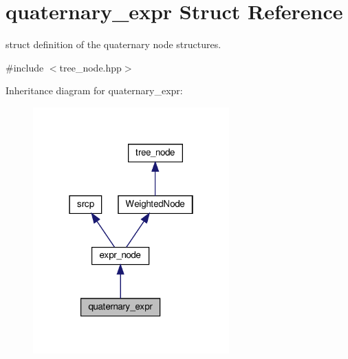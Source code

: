 \hypertarget{structquaternary__expr}{}\section{quaternary\+\_\+expr Struct Reference}
\label{structquaternary__expr}


struct definition of the quaternary node structures.  




{\ttfamily \#include $<$tree\+\_\+node.\+hpp$>$}



Inheritance diagram for quaternary\+\_\+expr\+:
\nopagebreak
\begin{figure}[H]
\begin{center}
\leavevmode
\includegraphics[width=214pt]{db/d33/structquaternary__expr__inherit__graph}
\end{center}
\end{figure}


